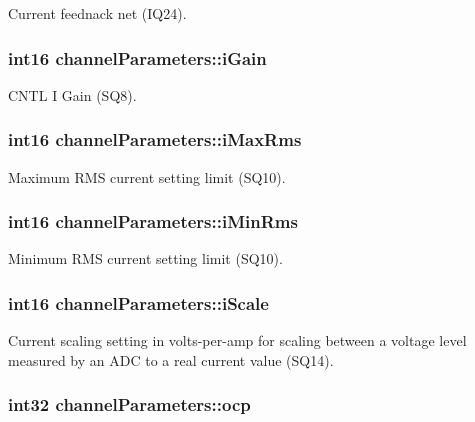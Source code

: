 Current feednack net (I\-Q24). \hypertarget{structchannel_parameters_aafa118e723af6d1ec3cb8dd28fd5e4ef}{
\subsubsection[{i\-Gain}]{\setlength{\rightskip}{0pt plus 5cm}int16 channel\-Parameters\-::i\-Gain}}\label{structchannel_parameters_aafa118e723af6d1ec3cb8dd28fd5e4ef}
C\-N\-T\-L I Gain (S\-Q8). \hypertarget{structchannel_parameters_ab4b8dda9d3ab4395a3fde8bc0e403212}{
\subsubsection[{i\-Max\-Rms}]{\setlength{\rightskip}{0pt plus 5cm}int16 channel\-Parameters\-::i\-Max\-Rms}}\label{structchannel_parameters_ab4b8dda9d3ab4395a3fde8bc0e403212}
Maximum R\-M\-S current setting limit (S\-Q10). \hypertarget{structchannel_parameters_a12f6946f5b0ee1235d7edcb6a22a4518}{
\subsubsection[{i\-Min\-Rms}]{\setlength{\rightskip}{0pt plus 5cm}int16 channel\-Parameters\-::i\-Min\-Rms}}\label{structchannel_parameters_a12f6946f5b0ee1235d7edcb6a22a4518}
Minimum R\-M\-S current setting limit (S\-Q10). \hypertarget{structchannel_parameters_a022031c9e8a34b37c6cd05d8d7934a13}{
\subsubsection[{i\-Scale}]{\setlength{\rightskip}{0pt plus 5cm}int16 channel\-Parameters\-::i\-Scale}}\label{structchannel_parameters_a022031c9e8a34b37c6cd05d8d7934a13}
Current scaling setting in volts-\/per-\/amp for scaling between a voltage level measured by an A\-D\-C to a real current value (S\-Q14). \hypertarget{structchannel_parameters_a95bd86963045f10f75c656956a09858c}{
\subsubsection[{ocp}]{\setlength{\rightskip}{0pt plus 5cm}int32 channel\-Parameters\-::ocp}}\label{structchannel_parameters_a95bd86963045f10f75c656956a09858c}
